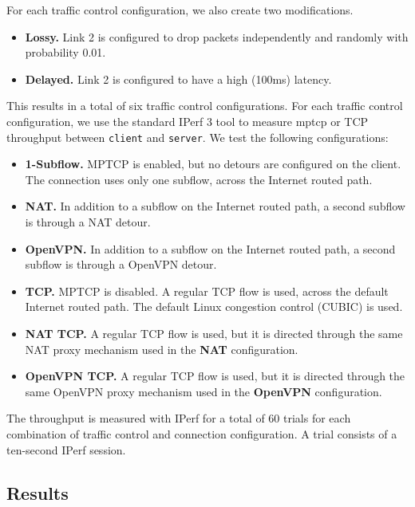 \documentclass{cwru}
\begin{document}
For each traffic control configuration, we also create two modifications.

\begin{itemize}
\item \textbf{Lossy.} Link 2 is configured to drop packets independently and
  randomly with probability 0.01.
\item \textbf{Delayed.} Link 2 is configured to have a high (100ms) latency.
\end{itemize}

This results in a total of six traffic control configurations. For each traffic
control configuration, we use the standard IPerf 3 tool to measure \ac{mptcp} or
TCP throughput between \texttt{client} and \texttt{server}. We test the
following configurations:

\begin{itemize}
\item \textbf{1-Subflow.} MPTCP is enabled, but no detours are configured on the
  client. The connection uses only one subflow, across the Internet routed path.
\item \textbf{NAT.} In addition to a subflow on the Internet routed path, a
  second subflow is through a NAT detour.
\item \textbf{OpenVPN.} In addition to a subflow on the Internet routed path, a
  second subflow is through a OpenVPN detour.
\item \textbf{TCP.} MPTCP is disabled. A regular TCP flow is used, across the
  default Internet routed path. The default Linux congestion control (CUBIC) is
  used.
\item \textbf{NAT TCP.} A regular TCP flow is used, but it is directed through
  the same NAT proxy mechanism used in the \textbf{NAT} configuration.
\item \textbf{OpenVPN TCP.} A regular TCP flow is used, but it is directed
  through the same OpenVPN proxy mechanism used in the \textbf{OpenVPN}
  configuration.
\end{itemize}

The throughput is measured with IPerf for a total of 60 trials for each
combination of traffic control and connection configuration. A trial consists of
a ten-second IPerf session.

\subsection{Results}
\end{document}
